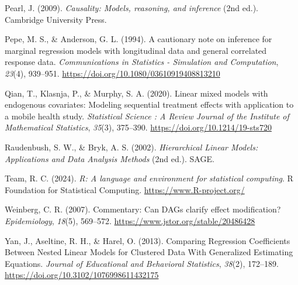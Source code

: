 \documentclass[
  12pt,
  a4paper,
]{article}
\newlength{\cslhangindent}
\newenvironment{CSLReferences}[2] %
 {\begin{list}{}{%
  \setlength{\itemindent}{0pt}
  \setlength{\leftmargin}{0pt}
  \setlength{\parsep}{0pt}
  \ifodd #1
   \setlength{\leftmargin}{\cslhangindent}
   \setlength{\itemindent}{-1\cslhangindent}
  \fi
  \setlength{\itemsep}{#2\baselineskip}}}
 {\end{list}}
\begin{document}
\begin{CSLReferences}{1}{0}
Pearl, J. (2009). \emph{Causality: Models, reasoning, and inference}
(2nd ed.). Cambridge University Press.

Pepe, M. S., \& Anderson, G. L. (1994). A cautionary note on inference
for marginal regression models with longitudinal data and general
correlated response data. \emph{Communications in Statistics -
Simulation and Computation}, \emph{23}(4), 939--951.
\url{https://doi.org/10.1080/03610919408813210}

Qian, T., Klasnja, P., \& Murphy, S. A. (2020). Linear mixed models with
endogenous covariates: Modeling sequential treatment effects with
application to a mobile health study. \emph{Statistical Science : A
Review Journal of the Institute of Mathematical Statistics},
\emph{35}(3), 375--390. \url{https://doi.org/10.1214/19-sts720}

Raudenbush, S. W., \& Bryk, A. S. (2002). \emph{Hierarchical Linear
Models: Applications and Data Analysis Methods} (2nd ed.). SAGE.

Team, R. C. (2024). \emph{R: A language and environment for statistical
computing}. R Foundation for Statistical Computing.
\url{https://www.R-project.org/}

Weinberg, C. R. (2007). Commentary: Can DAGs clarify effect
modification? \emph{Epidemiology}, \emph{18}(5), 569--572.
\url{https://www.jstor.org/stable/20486428}

Yan, J., Aseltine, R. H., \& Harel, O. (2013). Comparing Regression
Coefficients Between Nested Linear Models for Clustered Data With
Generalized Estimating Equations. \emph{Journal of Educational and
Behavioral Statistics}, \emph{38}(2), 172--189.
\url{https://doi.org/10.3102/1076998611432175}

\end{CSLReferences}
\end{document}
